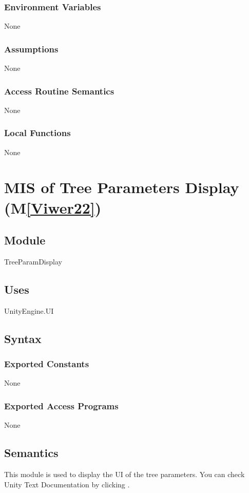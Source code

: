 \documentclass[12pt, titlepage]{article}
\newcommand{\mref}[1]{M\ref{#1}}
\begin{document}
\subsubsection{Environment Variables}
None

\subsubsection{Assumptions}

None

\subsubsection{Access Routine Semantics}
None

\subsubsection{Local Functions}
None

\newpage

\section{MIS of Tree Parameters Display (\mref{Viwer22})} 

\subsection{Module}
TreeParamDisplay

\subsection{Uses}
UnityEngine.UI 

\subsection{Syntax}

\subsubsection{Exported Constants}
None
\subsubsection{Exported Access Programs}
None

\subsection{Semantics}
This module is used to display the UI of the tree parameters.
You can check Unity Text Documentation by clicking \tref.
\end{document}
